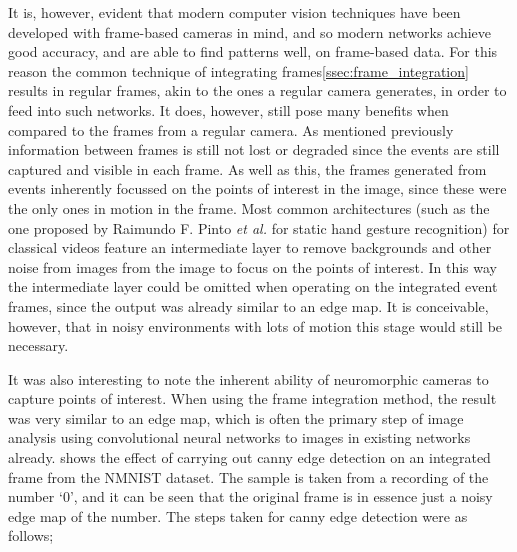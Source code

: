 It is, however, evident that modern computer vision techniques have been developed with frame-based cameras in mind, and so modern networks achieve good accuracy, and are able to find patterns well, on frame-based data. For this reason the common technique of integrating frames\cref{ssec:frame_integration} results in regular frames, akin to the ones a regular camera generates, in order to feed into such networks. It does, however, still pose many benefits when compared to the frames from a regular camera. As mentioned previously information between frames is still not lost or degraded since the events are still captured and visible in each frame. As well as this, the frames generated from events inherently focussed on the points of interest in the image, since these were the only ones in motion in the frame. Most common architectures (such as the one proposed by Raimundo F. Pinto \textit{et al.} for static hand gesture recognition\cite{StaticHandGesture}) for classical videos feature an intermediate layer to remove backgrounds and other noise from images from the image to focus on the points of interest. In this way the intermediate layer could be omitted when operating on the integrated event frames, since the output was already similar to an edge map. It is conceivable, however, that in noisy environments with lots of motion this stage would still be necessary.

It was also interesting to note the inherent ability of neuromorphic cameras to capture points of interest. When using the frame integration method, the result was very similar to an edge map, which is often the primary step of image analysis using convolutional neural networks to images in existing networks already.  shows the effect of carrying out canny edge detection\cite{CannyEdgeDetection} on an integrated frame from the NMNIST dataset. The sample is taken from a recording of the number `0', and it can be seen that the original frame is in essence just a noisy edge map of the number. The steps taken for canny edge detection were as follows;

